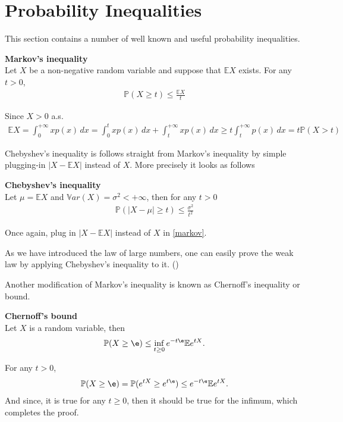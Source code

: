 \section{Probability Inequalities}\label{2}
This section contains a number of well known and useful probability inequalities. 
\begin{thm}
\textbf{Markov's inequality} \\
Let $X$ be a non-negative random variable and suppose that $\mathbb{E} X$ exists. For any $t > 0$,
\begin{align}\label{markov}
    \mathbb{P}(X \ge t) \le \frac{\mathbb{E}X}{t}
\end{align}
\end{thm}
\begin{s}
Since $X > 0$ a.s. 
\begin{align*}
    \mathbb{E} X = \int_0^{+\infty} x p(x) \, dx = \int_0^t x p(x) \, dx + \int_t^{+\infty} x p(x) \, dx \ge t \int_t^{+\infty} p(x) \, dx = t \mathbb{P}(X > t)
\end{align*}
\end{s}
Chebyshev's inequality is follows straight from Markov's inequality by simple plugging-in $|X - \mathbb{E}X|$ instead of $X$. More precisely it looks as follows
\begin{thm}
\textbf{Chebyshev's inequality} \\
Let $\mu = \mathbb{E} X$ and $\mathbb{V}ar(X) = \sigma^2 < +\infty$, then for any $t > 0$
\begin{align}
    \mathbb{P}(|X - \mu| \ge t) \le \frac{\sigma^2}{t^2}
\end{align}
\end{thm}
\begin{s}
Once again, plug in $|X-\mathbb{E}X|$ instead of $X$ in \eqref{markov}.
\end{s}
As we have introduced the law of large numbers, one can easily prove the weak law by applying Chebyshev's inequality to it. ({\color{blue}{do it as an exercise}})
\par Another modification of Markov's inequality is known as Chernoff's inequality or bound. 
\begin{thm}
\textbf{Chernoff's bound} \\    
Let $X$ is a random variable, then 
\begin{align}\label{chernoff}
\mathbb{P}(X \ge \e) \le \inf_{t \ge 0} e^{-t\e} \mathbb{E} e^{tX}.
\end{align}
\end{thm}
\begin{s}
For any $t > 0$,
\begin{align}
    \mathbb{P}(X \ge \e) = \mathbb{P}(e^{tX} \ge e^{t\e}) \le e^{-t\e} \mathbb{E} e^{tX}.
\end{align}
And since, it is true for any $t \ge 0$, then it should be true for the infimum, which completes the proof.
\end{s}
